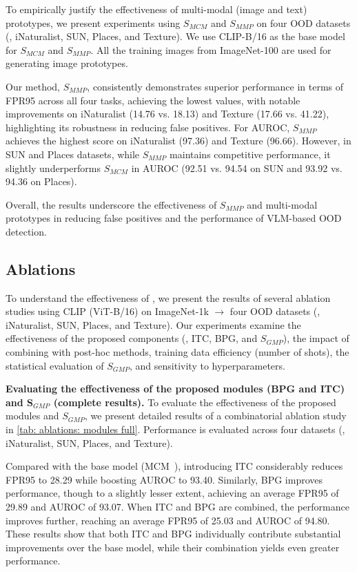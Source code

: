 To empirically justify the effectiveness of multi-modal (image and text) prototypes, we present experiments using $S_{\textit{MCM}}$ and $S_{\textit{MMP}}$ on four OOD datasets (\ie, iNaturalist, SUN, Places, and Texture). 
We use CLIP-B/16 as the base model for $S_{\textit{MCM}}$ and $S_{\textit{MMP}}$. 
All the training images from ImageNet-100 are used for generating image prototypes.

Our method, $S_{\textit{MMP}}$, consistently demonstrates superior performance in terms of FPR95 across all four tasks, achieving the lowest values, with notable improvements on iNaturalist (14.76 vs. 18.13) and Texture (17.66 vs. 41.22), highlighting its robustness in reducing false positives. 
For AUROC, $S_{\textit{MMP}}$ achieves the highest score on iNaturalist (97.36) and Texture (96.66). 
However, in SUN and Places datasets, while $S_{\textit{MMP}}$ maintains competitive performance, it slightly underperforms $S_{\textit{MCM}}$ in AUROC (92.51 vs. 94.54 on SUN and 93.92 vs. 94.36 on Places).

Overall, the results underscore the effectiveness of $S_{\textit{MMP}}$ and multi-modal prototypes in reducing false positives and the performance of VLM-based OOD detection.
    
\subsection{Ablations}
\label{Appendix: Sec: More ablations}

To understand the effectiveness of \ours, we present the results of several ablation studies using CLIP (ViT-B/16) on ImageNet-1k $\rightarrow$ four OOD datasets (\ie, iNaturalist, SUN, Places, and Texture). Our experiments examine the effectiveness of the proposed components (\ie, ITC, BPG, and $S_{\textit{GMP}}$), the impact of combining \ours with post-hoc methods, training data efficiency (number of shots), the statistical evaluation of $S_{\textit{GMP}}$, and sensitivity to hyperparameters.

\noindent
\textbf{Evaluating the effectiveness of the proposed modules (BPG and ITC) and $\pmb{S_{\textit{GMP}}}$ (complete results).}
To evaluate the effectiveness of the proposed modules and $S_{\textit{GMP}}$, we present detailed results of a combinatorial ablation study in \cref{tab: ablations: modules full}. 
Performance is evaluated across four datasets (\ie, iNaturalist, SUN, Places, and Texture). 

Compared with the base model (MCM~\cite{ming2022delving}), introducing ITC considerably reduces FPR95 to 28.29 while boosting AUROC to 93.40. 
Similarly, BPG improves performance, though to a slightly lesser extent, achieving an average FPR95 of 29.89 and AUROC of 93.07. 
When ITC and BPG are combined, the performance improves further, reaching an average FPR95 of 25.03 and AUROC of 94.80. 
These results show that both ITC and BPG individually contribute substantial improvements over the base model, while their combination yields even greater performance.

